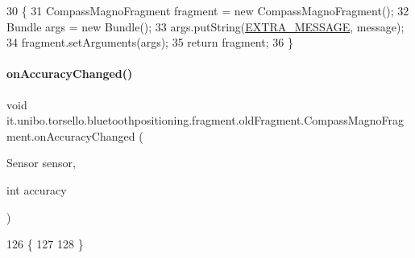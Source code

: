 \begin{DoxyCode}
30                                                                    \{
31         CompassMagnoFragment fragment = \textcolor{keyword}{new} CompassMagnoFragment();
32         Bundle args = \textcolor{keyword}{new} Bundle();
33         args.putString(\hyperlink{classit_1_1unibo_1_1torsello_1_1bluetoothpositioning_1_1fragment_1_1oldFragment_1_1CompassMagnoFragment_ad570a334dd03dbb05b6615a4df79e811_ad570a334dd03dbb05b6615a4df79e811}{EXTRA\_MESSAGE}, message);
34         fragment.setArguments(args);
35         \textcolor{keywordflow}{return} fragment;
36     \}
\end{DoxyCode}
\hypertarget{classit_1_1unibo_1_1torsello_1_1bluetoothpositioning_1_1fragment_1_1oldFragment_1_1CompassMagnoFragment_ab7f5e45a12c41ff850294d67ae54ae4c_ab7f5e45a12c41ff850294d67ae54ae4c}{}\label{classit_1_1unibo_1_1torsello_1_1bluetoothpositioning_1_1fragment_1_1oldFragment_1_1CompassMagnoFragment_ab7f5e45a12c41ff850294d67ae54ae4c_ab7f5e45a12c41ff850294d67ae54ae4c} 
\paragraph{\texorpdfstring{on\+Accuracy\+Changed()}{onAccuracyChanged()}}
{\footnotesize\ttfamily void it.\+unibo.\+torsello.\+bluetoothpositioning.\+fragment.\+old\+Fragment.\+Compass\+Magno\+Fragment.\+on\+Accuracy\+Changed (\begin{DoxyParamCaption}\item[{Sensor}]{sensor,  }\item[{int}]{accuracy }\end{DoxyParamCaption})}


\begin{DoxyCode}
126                                                                \{
127 
128     \}
\end{DoxyCode}
\hypertarget{classit_1_1unibo_1_1torsello_1_1bluetoothpositioning_1_1fragment_1_1oldFragment_1_1CompassMagnoFragment_ac7b5ed11aa2b31a711158c4b7dd1b3ec_ac7b5ed11aa2b31a711158c4b7dd1b3ec}{}\label{classit_1_1unibo_1_1torsello_1_1bluetoothpositioning_1_1fragment_1_1oldFragment_1_1CompassMagnoFragment_ac7b5ed11aa2b31a711158c4b7dd1b3ec_ac7b5ed11aa2b31a711158c4b7dd1b3ec} 
